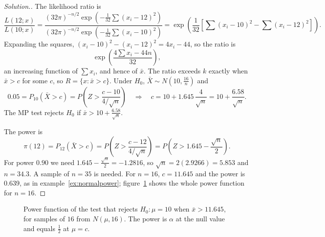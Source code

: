 \documentclass[12pt,a4paper]{report}
\theoremstyle{definition}
\theoremstyle{plain}
\newenvironment{solution}
  {\renewcommand{\qedsymbol}{}\begin{proof}[\textit{Solution}.]}
  {\end{proof}}
\begin{document}
\begin{solution}
The likelihood ratio is
\[\frac{L(12;x)}{L(10;x)}
= \frac{(32\pi)^{-n/2}\exp\left(-\frac{1}{32}\sum(x_i - 12)^2\right)}
{(32\pi)^{-n/2}\exp\left(-\frac{1}{32}\sum(x_i - 10)^2\right)}
= \exp\left(\frac{1}{32}\left[\sum(x_i - 10)^2 - \sum(x_i - 12)^2\right]\right).\]
Expanding the squares, $(x_i - 10)^2 - (x_i - 12)^2 = 4x_i - 44$, so the ratio is
\[\exp\left(\frac{4\sum x_i - 44n}{32}\right),\]
an increasing function of $\sum x_i$, and hence of $\bar x$. The ratio exceeds
$k$ exactly when $\bar x>c$ for some $c$, so $R = \{x : \bar x>c\}$. Under $H_0$,
$\bar X\sim N\left(10,\frac{16}{n}\right)$ and
\[0.05 = P_{10}(\bar X>c) = P\left(Z>\frac{c - 10}{4/\sqrt n}\right)
\quad\Longrightarrow\quad c = 10 + 1.645\,\frac{4}{\sqrt n} = 10 + \frac{6.58}{\sqrt n} .\]
The MP test rejects $H_0$ if $\bar x>10 + \frac{6.58}{\sqrt n}$.

The power is
\[\pi(12) = P_{12}(\bar X>c) = P\left(Z>\frac{c - 12}{4/\sqrt n}\right)
= P\left(Z>1.645 - \frac{\sqrt n}{2}\right).\]
For power $0.90$ we need $1.645 - \frac{\sqrt n}{2} = -1.2816$, so
$\sqrt n = 2(2.9266) = 5.853$ and $n = 34.3$. A sample of $n = 35$ is needed. For
$n = 16$, $c = 11.645$ and the power is $0.639$, as in
example~\ref{ex:normalpower}; figure~\ref{fig:powercurve} shows the whole power
function for $n = 16$.
\end{solution}

\begin{figure}[H]
\centering
{}
\caption{Power function of the test that rejects $H_0\colon\mu = 10$ when
$\bar x>11.645$, for samples of $16$ from $N(\mu,16)$. The power is $\alpha$ at
the null value and equals $\frac12$ at $\mu = c$.}
\label{fig:powercurve}
\end{figure}
\end{document}
